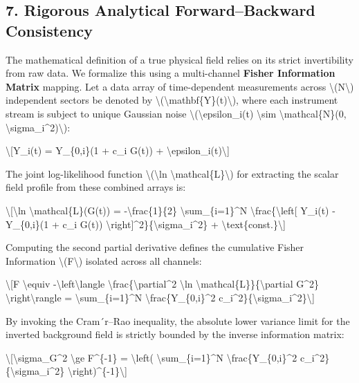 \documentclass[
  10pt,
]{article}
\begin{document}
\hypertarget{rigorous-analytical-forwardbackward-consistency}{%
\subsection{7. Rigorous Analytical Forward--Backward
Consistency}\label{rigorous-analytical-forwardbackward-consistency}}

The mathematical definition of a true physical field relies on its
strict invertibility from raw data. We formalize this using a
multi-channel \textbf{Fisher Information Matrix} mapping. Let a data
array of time-dependent measurements across
\textbackslash(N\textbackslash) independent sectors be denoted by
\textbackslash(\textbackslash mathbf\{Y\}(t)\textbackslash), where each
instrument stream is subject to unique Gaussian noise
\textbackslash(\textbackslash epsilon\_i(t) \textbackslash sim
\textbackslash mathcal\{N\}(0,
\textbackslash sigma\_i\^{}2)\textbackslash):

\textbackslash{[}Y\_i(t) = Y\_\{0,i\}(1 + c\_i G(t)) +
\textbackslash epsilon\_i(t)\textbackslash{]}

The joint log-likelihood function \textbackslash(\textbackslash ln
\textbackslash mathcal\{L\}\textbackslash) for extracting the scalar
field profile from these combined arrays is:

\textbackslash{[}\textbackslash ln \textbackslash mathcal\{L\}(G(t)) =
-\textbackslash frac\{1\}\{2\} \textbackslash sum\_\{i=1\}\^{}N
\textbackslash frac\{\textbackslash left{[} Y\_i(t) - Y\_\{0,i\}(1 +
c\_i G(t))
\textbackslash right{]}\^{}2\}\{\textbackslash sigma\_i\^{}2\} +
\textbackslash text\{const.\}\textbackslash{]}

Computing the second partial derivative defines the cumulative Fisher
Information \textbackslash(F\textbackslash) isolated across all
channels:

\textbackslash{[}F \textbackslash equiv
-\textbackslash left\textbackslash langle
\textbackslash frac\{\textbackslash partial\^{}2 \textbackslash ln
\textbackslash mathcal\{L\}\}\{\textbackslash partial G\^{}2\}
\textbackslash right\textbackslash rangle =
\textbackslash sum\_\{i=1\}\^{}N \textbackslash frac\{Y\_\{0,i\}\^{}2
c\_i\^{}2\}\{\textbackslash sigma\_i\^{}2\}\textbackslash{]}

By invoking the Cram´r--Rao inequality, the absolute lower variance
limit for the inverted background field is strictly bounded by the
inverse information matrix:

\textbackslash{[}\textbackslash sigma\_G\^{}2 \textbackslash ge
F\^{}\{-1\} = \textbackslash left( \textbackslash sum\_\{i=1\}\^{}N
\textbackslash frac\{Y\_\{0,i\}\^{}2
c\_i\^{}2\}\{\textbackslash sigma\_i\^{}2\}
\textbackslash right)\^{}\{-1\}\textbackslash{]}
\end{document}
